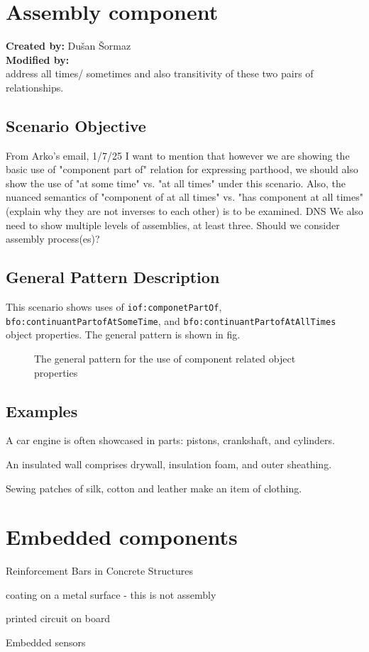 \section{Assembly component}

\textbf{Created by:} Dušan Šormaz \\
\textbf{Modified by:}  \\

address all times/ sometimes and also transitivity of these two pairs of relationships.

\subsection*{Scenario Objective}
From Arko's email, 1/7/25 
I want to mention that however we are showing the basic use of "component part of" relation for expressing parthood, we should also show the use of "at some time" vs. "at all times" under this scenario. Also, the nuanced semantics of "component of at all times" vs. "has component at all times" (explain why they are not inverses to each other) is to be examined.
DNS
We also need to show multiple levels of assemblies, at least three. Should we consider assembly process(es)?
\subsection*{General Pattern Description}
This scenario shows uses of \texttt{iof:componetPartOf}, \texttt{bfo:continuantPartofAtSomeTime}, and \texttt{bfo:continuantPartofAtAllTimes} object properties. The general pattern is shown in fig. 

\begin{figure}

\caption{The general pattern for the use of component related object properties} 
\label{gen-pttn-components}
\end{figure}


\subsection*{Examples}

A car engine is often showcased in parts: pistons, crankshaft, and cylinders.

An insulated wall comprises drywall, insulation foam, and outer sheathing.

Sewing patches of silk, cotton and leather make an item of clothing.

\section{Embedded components}

Reinforcement Bars in Concrete Structures

coating on a metal surface - this is not assembly

printed circuit on board

Embedded sensors